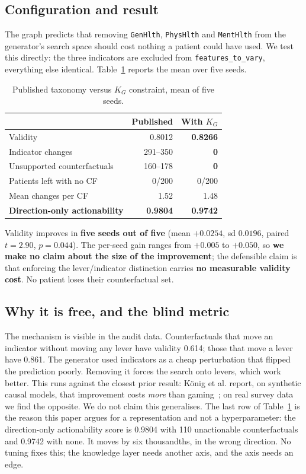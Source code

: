 \documentclass[conference]{IEEEtran}
\begin{document}
\subsection{Configuration and result}
The graph predicts that removing \texttt{GenHlth}, \texttt{PhysHlth} and \texttt{MentHlth} from the generator's search space should cost nothing a patient could have used. We test this directly: the three indicators are excluded from \texttt{features\_to\_vary}, everything else identical. Table~\ref{tab:enforce} reports the mean over five seeds.

\begin{table}[t]
\caption{Published taxonomy versus $K_G$ constraint, mean of five seeds.}
\label{tab:enforce}
\centering
\footnotesize
\begin{tabular}{@{}lrr@{}}
\toprule
 & \textbf{Published} & \textbf{With $K_G$} \\
\midrule
Validity & 0.8012 & \textbf{0.8266} \\
Indicator changes & 291--350 & \textbf{0} \\
Unsupported counterfactuals & 160--178 & \textbf{0} \\
Patients left with no CF & 0/200 & 0/200 \\
Mean changes per CF & 1.52 & 1.48 \\
\textbf{Direction-only actionability} & \textbf{0.9804} & \textbf{0.9742} \\
\bottomrule
\end{tabular}
\end{table}

Validity improves in \textbf{five seeds out of five} (mean $+0.0254$, sd $0.0196$, paired $t=2.90$, $p=0.044$). The per-seed gain ranges from $+0.005$ to $+0.050$, so \textbf{we make no claim about the size of the improvement}; the defensible claim is that enforcing the lever/indicator distinction carries \textbf{no measurable validity cost}. No patient loses their counterfactual set.

\subsection{Why it is free, and the blind metric}
The mechanism is visible in the audit data. Counterfactuals that move an indicator without moving any lever have validity 0.614; those that move a lever have 0.861. The generator used indicators as a cheap perturbation that flipped the prediction poorly. Removing it forces the search onto levers, which work better. This runs against the closest prior result: K\"onig et al. report, on synthetic causal models, that improvement costs \emph{more} than gaming~\cite{konig2023}; on real survey data we find the opposite. We do not claim this generalises. The last row of Table~\ref{tab:enforce} is the reason this paper argues for a representation and not a hyperparameter: the direction-only actionability score is 0.9804 with 110 unactionable counterfactuals and 0.9742 with none. It moves by six thousandths, in the wrong direction. No tuning fixes this; the knowledge layer needs another axis, and the axis needs an edge.
\end{document}
